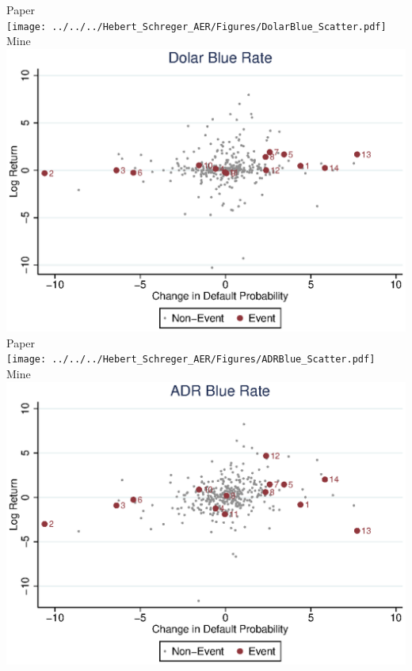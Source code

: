 \documentclass{article}
\begin{document}
\newpage Paper \\
\texttt{[image: ../../../Hebert\_Schreger\_AER/Figures/DolarBlue\_Scatter.pdf]}\\
Mine \\
\includegraphics[scale = .8]{DolarBlue_Scatter.eps}\\

\newpage Paper \\
\texttt{[image: ../../../Hebert\_Schreger\_AER/Figures/ADRBlue\_Scatter.pdf]}\\ 
Mine \\
\includegraphics[scale = .8]{ADRBlue_Scatter.eps}\\
\end{document}
